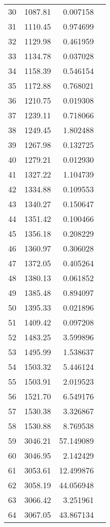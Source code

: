 \begin{tabular}{r|rr|l}
30 &     1087.81 &   0.007158  & \\
31 &     1110.45 &   0.974699  & \\
32 &     1129.98 &   0.461959  & \\
33 &     1134.78 &   0.037028  & \\
34 &     1158.39 &   0.546154  & \\
35 &     1172.88 &   0.768021  & \\
36 &     1210.75 &   0.019308  & \\
37 &     1239.11 &   0.718066  & \\
38 &     1249.45 &   1.802488  & \\
39 &     1267.98 &   0.132725  & \\
40 &     1279.21 &   0.012930  & \\
41 &     1327.22 &   1.104739  & \\
42 &     1334.88 &   0.109553  & \\
43 &     1340.27 &   0.150647  & \\
44 &     1351.42 &   0.100466  & \\
45 &     1356.18 &   0.208229  & \\
46 &     1360.97 &   0.306028  & \\
47 &     1372.05 &   0.405264  & \\
48 &     1380.13 &   0.061852  & \\
49 &     1385.48 &   0.894097  & \\
50 &     1395.33 &   0.021896  & \\
51 &     1409.42 &   0.097208  & \\
52 &     1483.25 &   3.599896  & \\
53 &     1495.99 &   1.538637  & \\
54 &     1503.32 &   5.446124  & \\
55 &     1503.91 &   2.019523  & \\
56 &     1521.70 &   6.549176  & \\
57 &     1530.38 &   3.326867  & \\
58 &     1530.88 &   8.769538  & \\
59 &     3046.21 &  57.149089  & \\
60 &     3046.95 &   2.142429  & \\
61 &     3053.61 &  12.499876  & \\
62 &     3058.19 &  44.056948  & \\
63 &     3066.42 &   3.251961  & \\
64 &     3067.05 &  43.867134  & \\

\end{tabular}
